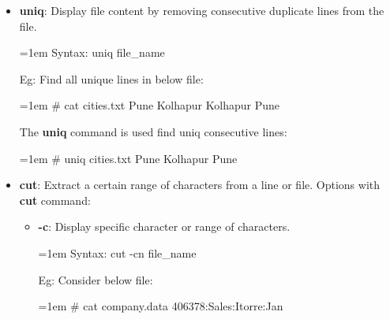 \begin{flushleft}
\begin{itemize}
		\bigskip
		\bigskip
		\item \textbf{uniq}: Display file content by removing consecutive duplicate lines from the file.
		\bigskip
		\begin{tcolorbox}[breakable,notitle,boxrule=-0pt,colback=pink,colframe=pink]
			\color{black}
			\font=1em
			Syntax: uniq file\_name
			\font=4pt
		\end{tcolorbox}
		Eg: Find all unique lines in below file:
		\bigskip
		\begin{tcolorbox}[breakable,notitle,boxrule=-0pt,colback=black,colframe=black]
			\color{green}
			\font=1em
			\# cat cities.txt
			\newline
			\color{white}
			Pune
			\newline
			Kolhapur
			\newline
			Kolhapur
			\newline
			Pune
			\font=4pt
		\end{tcolorbox}		
		The \textbf{uniq} command is used find uniq consecutive lines:
		\begin{tcolorbox}[breakable,notitle,boxrule=-0pt,colback=black,colframe=black]
			\color{green}
			\font=1em
			\# uniq cities.txt
			\newline
			\color{white}
			Pune
			\newline
			Kolhapur
			\newline
			Pune
			\font=4pt
		\end{tcolorbox}		
		\bigskip
		\bigskip
		\item \textbf{cut}: Extract a certain range of characters from a line or file.
		\newline
		Options with \textbf{cut} command:
		\begin{itemize}
		\item  \textbf{-c}: Display specific character or range of characters.
		\bigskip
		\begin{tcolorbox}[breakable,notitle,boxrule=-0pt,colback=pink,colframe=pink]
			\color{black}
			\font=1em
			Syntax: cut -cn  file\_name
			\font=4pt
		\end{tcolorbox}
		Eg: Consider below file:
		\bigskip
		\begin{tcolorbox}[breakable,notitle,boxrule=-0pt,colback=black,colframe=black]
			\color{green}
			\font=1em
			\# cat company.data
			\newline
			\color{white}
			406378:Sales:Itorre:Jan
			\newline

\end{tcolorbox}
\end{itemize}
\end{itemize}
\end{flushleft}
